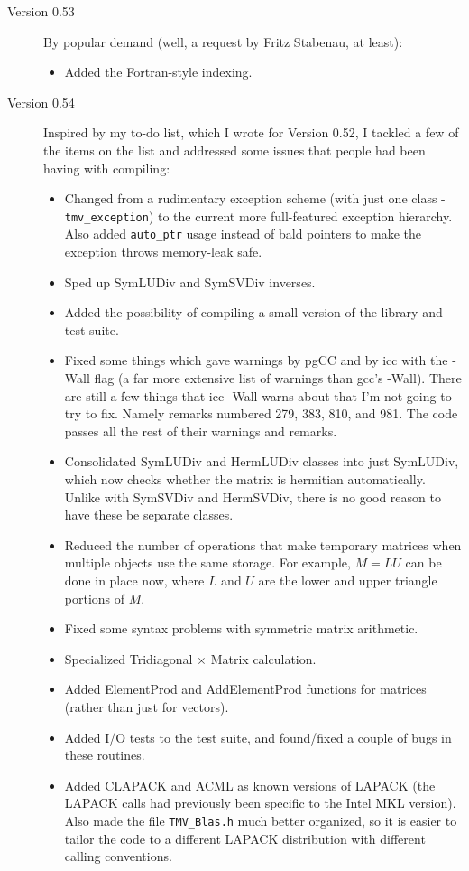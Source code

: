 \documentclass[twoside,letterpaper,11pt]{article}
\renewcommand{\tt}[1]{{\texttt {#1}}}
\begin{document}
\begin{description}
\item[Version 0.53]
By popular demand (well, a request by Fritz Stabenau, at least):
\begin{itemize}
\item
Added the Fortran-style indexing.
\end{itemize}

\item[Version 0.54]
Inspired by my to-do list, which I wrote for Version 0.52, I tackled a few of the 
items on the list and addressed some issues that people had been having
with compiling:
\begin{itemize}
\item
Changed from a rudimentary exception scheme (with just one class - 
\tt{tmv\_exception}) to the current more full-featured exception hierarchy.
Also added \tt{auto\_ptr} usage instead of bald pointers to make the 
exception throws memory-leak safe.
\item
Sped up SymLUDiv and SymSVDiv inverses.
\item
Added the possibility of compiling a small version of the library and test suite.
\item
Fixed some things which gave warnings by pgCC and by icc with the -Wall flag
(a far more extensive list of warnings than gcc's -Wall).  There are still a 
few things that icc -Wall warns about that I'm not going to try to fix.  
Namely remarks numbered 279, 383, 810, and 981.  The code passes all the rest
of their warnings and remarks.
\item
Consolidated SymLUDiv and HermLUDiv classes into just SymLUDiv, which now checks
whether the matrix is hermitian automatically.  Unlike with SymSVDiv and
HermSVDiv, there is no good reason to have these be separate classes.
\item
Reduced the number of operations that make temporary matrices when multiple
objects use the same storage.  For example, $M = L U$ can be done in place now, where 
$L$ and $U$ are the lower and upper triangle portions of $M$.
\item
Fixed some syntax problems with symmetric matrix arithmetic.
\item
Specialized Tridiagonal $\times$ Matrix calculation.
\item
Added ElementProd and AddElementProd functions for matrices (rather than just
for vectors).
\item
Added I/O tests to the test suite, and found/fixed a couple of bugs in these 
routines.
\item
Added CLAPACK and ACML as known versions of LAPACK (the LAPACK calls
had previously been specific to the Intel MKL version).  Also made the file
\tt{TMV\_Blas.h} much better organized, so it is easier to tailor the code to 
a different LAPACK distribution with different calling conventions.


\end{itemize}
\end{description}
\end{document}
